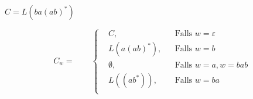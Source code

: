 \documentclass[a4paper, 11pt]{article}
\begin{document}
$C = L(ba(ab)^*)$ \\

\begin{center}
\begin{equation*}
 C_w = \qquad	
 \left\{
 \begin{aligned}
	& C, && \text{Falls } w = \varepsilon \\
    & L(a(ab)^*), && \text{Falls } w = b \\
    & \emptyset, && \text{Falls } w = a, w = bab \\
    & L((ab^*)), && \text{Falls } w = ba \\
	\end{aligned}
	\right.
\end{equation*}
\end{center}
\end{document}
